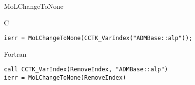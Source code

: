 \begin{FunctionDescription}{MoLChangeToNone}
  \begin{ExampleSection}
    \begin{Example}{C}
\begin{verbatim}
ierr = MoLChangeToNone(CCTK_VarIndex("ADMBase::alp"));
\end{verbatim}
    \end{Example}
    \begin{Example}{Fortran}
\begin{verbatim}
call CCTK_VarIndex(RemoveIndex, "ADMBase::alp")
ierr = MoLChangeToNone(RemoveIndex)
\end{verbatim}
    \end{Example}
  \end{ExampleSection}

\end{FunctionDescription}



